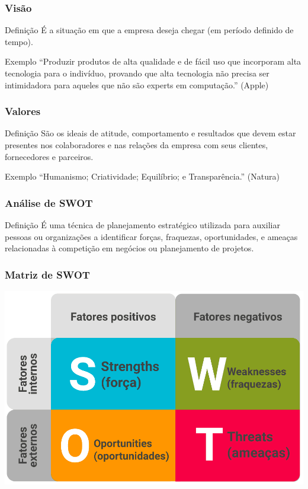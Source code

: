 \documentclass[aspectratio=169]{beamer}
\begin{document}
\begin{frame}
	\frametitle{Visão}

	\begin{block}{Defini\c cão}
		É a situação em que a empresa deseja chegar (em período definido de tempo).
	\end{block}\vfill

	\begin{exampleblock}{Exemplo}
		``Produzir produtos de alta qualidade e de fácil uso que incorporam alta tecnologia para o indivíduo, provando que alta tecnologia não precisa ser intimidadora para aqueles que não são experts em computação.'' (Apple)
	\end{exampleblock}
\end{frame}

\begin{frame}
	\frametitle{Valores}

	\begin{block}{Defini\c cão}
		São os ideais de atitude, comportamento e resultados que devem estar presentes nos colaboradores e nas relações da empresa com seus clientes, fornecedores e parceiros.
	\end{block}\vfill
	
	\begin{exampleblock}{Exemplo}
		``Humanismo; Criatividade; Equilíbrio; e Transparência.'' (Natura)
	\end{exampleblock}
\end{frame}

\begin{frame}
	\frametitle{Análise de SWOT}

	\begin{block}{Defini\c cão}
		É uma técnica de planejamento estratégico utilizada para auxiliar pessoas ou organizações a identificar forças, fraquezas, oportunidades, e ameaças relacionadas à competição em negócios ou planejamento de projetos.
	\end{block}	
\end{frame}

\begin{frame}
	\frametitle{Matriz de SWOT}

	\begin{center}
		\includegraphics[scale=0.3]{img/matriz_swot}
	\end{center}
\end{frame}
\end{document}
